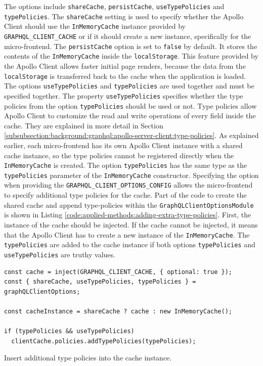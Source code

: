 \noindent The options include \texttt{shareCache}, \texttt{persistCache}, \texttt{useTypePolicies} and \texttt{typePolicies}. The \texttt{shareCache} setting is used to specify whether the Apollo Client should use the \texttt{InMemoryCache} instance provided by \texttt{GRAPHQL\_CLIENT\_CACHE} or if it should create a new instance, specifically for the micro-frontend. The \texttt{persistCache} option is set to \texttt{false} by default. It stores the contents of the \texttt{InMemoryCache} inside the \texttt{localStorage}. This feature provided by the Apollo Client allows faster initial page renders, because the data from the \texttt{localStorage} is transferred back to the cache when the application is loaded. The options \texttt{useTypePolicies} and \texttt{typePolicies} are used together and must be specified together. The property \texttt{useTypePolicies} specifies whether the type policies from the option \texttt{typePolicies} should be used or not. Type policies allow Apollo Client to customize the read and write operations of every field inside the cache. They are explained in more detail in Section \ref{subsubsection:background:graphql:apollo-server-client:type-policies}. As explained earlier, each micro-frontend has its own Apollo Client instance with a shared cache instance, so the type policies cannot be registered directly when the \texttt{InMemoryCache} is created. The option \texttt{typePolicies} has the same type as the \texttt{typePolicies} parameter of the \texttt{InMemoryCache} constructor. Specifying the option when providing the \texttt{GRAPHQL\_CLIENT\_OPTIONS\_CONFIG} allows the micro-frontend to specify additional type policies for the cache. Part of the code to create the shared cache and append type-policies within the \texttt{GraphQLClientOptionsModule} is shown in Listing \ref{code:applied-methods:adding-extra-type-policies}. First, the instance of the cache should be injected. If the cache cannot be injected, it means that the Apollo Client has to create a new instance of the \texttt{InMemoryCache}. The \texttt{typePolicies} are added to the cache instance if both options \texttt{typePolicies} and \texttt{useTypePolicies} are truthy values.

\ifshowListings
\begin{listing}[H]
\begin{verbatim}
const cache = inject(GRAPHQL_CLIENT_CACHE, { optional: true });
const { shareCache, useTypePolicies, typePolicies } = graphQLClientOptions;

const cacheInstance = shareCache ? cache : new InMemoryCache();

if (typePolicies && useTypePolicies)
  clientCache.policies.addTypePolicies(typePolicies);
\end{verbatim}
\caption{Insert additional type policies into the cache instance.}\label{code:applied-methods:adding-extra-type-policies}
\end{listing}
\fi
